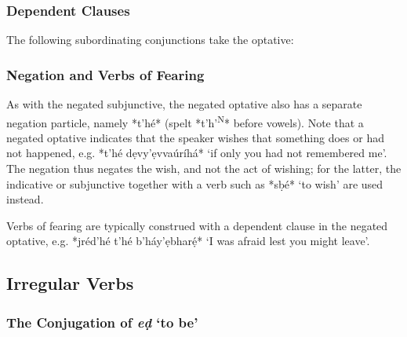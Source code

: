 \documentclass[a4paper, 12pt, oneside, final]{article}
\newlength{\EnumItemSep} \EnumItemSep-3pt
\newenvironment { dlist } [1] [{}] {
    \vspace { -.5em }
    \begingroup
    \def\descriptionlabel ##1 {\hspace\labelsep \normalfont #1 ##1}
    \settowidth \leftmargini { 99.\hskip\labelsep }
    \begin { description }
    \itemsep \EnumItemSep
} {
    \end { description }
    \endgroup
    \vspace { -.5em }
}
\def \N {\textsuperscript{N}}
\begin{document}
\subsubsection{Dependent Clauses}
The following subordinating conjunctions take the optative:

\subsubsection{Negation and Verbs of Fearing}
As with the negated subjunctive, the negated optative also has a separate negation particle, namely *t’hé*
(spelt *t’h’\N* before vowels). Note that a negated optative indicates that the speaker wishes that something does
or had not happened, e.g. *t’hé dẹvy’ẹvvaúríhá* ‘if only you had not remembered me’. The negation thus negates
the wish, and not the act of wishing; for the latter, the indicative or subjunctive together with a verb such
as *sḅé* ‘to wish’ are used instead.

Verbs of fearing are typically construed with a dependent clause in the negated optative, e.g. *jréd’hé
t’hé b’háy’ẹbharẹ́* ‘I was afraid lest you might leave’.

\subsection{Irregular Verbs}\label{subsec:irregular-verbs}
\subsubsection{The Conjugation of \textit{eḍ} ‘to be’}
\end{document}
